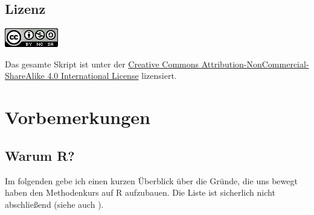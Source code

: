 \documentclass[]{book}
\begin{document}
\section*{Lizenz}\label{lizenz}

\begin{center}\includegraphics[width=0.2\linewidth]{figures/license} \end{center}

Das gesamte Skript ist unter der
\href{http://creativecommons.org/licenses/by-nc-sa/4.0/}{Creative
Commons Attribution-NonCommercial-ShareAlike 4.0 International License}
lizensiert.

\chapter{Vorbemerkungen}\label{precons}

\section{Warum R?}\label{warum-r}

Im folgenden gebe ich einen kurzen Überblick über die Gründe, die uns
bewegt haben den Methodenkurs auf R aufzubauen. Die Liste ist sicherlich
nicht abschließend (siehe auch \citet{adv-r}).
\end{document}
